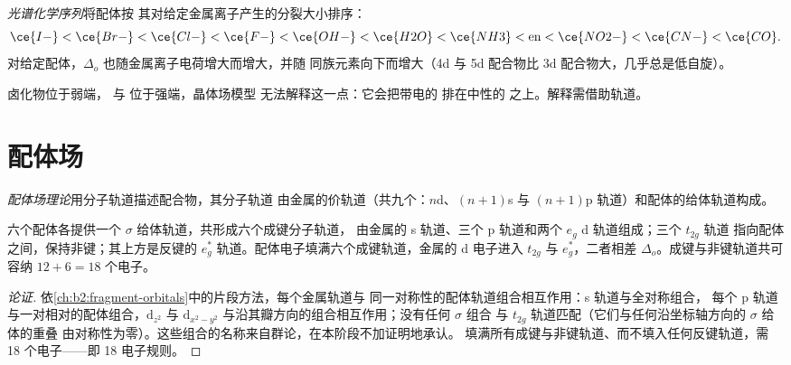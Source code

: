 \begin{definition}[光谱化学序列]\label{def:b2:ligand-field:spectrochemical}
\emph{光谱化学序列}将配体按
其对给定金属离子产生的分裂大小排序：
\[
  \ce{I-} < \ce{Br-} < \ce{Cl-} < \ce{F-} < \ce{OH-} < \ce{H2O} < \ce{NH3} < \text{en} <
  \ce{NO2-} < \ce{CN-} < \ce{CO} .
\]
对给定配体，$\Delta_o$ 也随金属离子电荷增大而增大，并随
同族元素向下而增大（4d 与 5d 配合物比 3d 配合物大，几乎总是低自旋）。
\end{definition}

卤化物位于弱端， 与  位于强端，晶体场模型
无法解释这一点：它会把带电的  排在中性的
 之上。解释需借助轨道。

\section{配体场}

\begin{definition}[配体场理论]\label{def:b2:ligand-field:ligand-field}
\emph{配体场理论}用分子轨道描述配合物，其分子轨道
由金属的价轨道（共九个：$n$d、$(n+1)$s 与 $(n+1)$p
轨道）和配体的给体轨道构成。
\end{definition}

\begin{proposition}\label{prop:b2:ligand-field:mo-octahedral}
六个配体各提供一个 $\sigma$ 给体轨道，共形成六个成键分子轨道，
由金属的 s 轨道、三个 p 轨道和两个 $e_g$ d 轨道组成；三个 $t_{2g}$ 轨道
指向配体之间，保持非键；其上方是反键的 $e_g^*$
轨道。配体电子填满六个成键轨道，金属的 d 电子进入
$t_{2g}$ 与 $e_g^*$，二者相差 $\Delta_o$。成键与非键轨道共可容纳
$12 + 6 = 18$ 个电子。
\end{proposition}

\begin{proof}[论证]
依\cref{ch:b2:fragment-orbitals}中的片段方法，每个金属轨道与
同一对称性的配体轨道组合相互作用：s 轨道与全对称组合，
每个 p 轨道与一对相对的配体组合，$\mathrm d_{z^2}$ 与 $\mathrm
d_{x^2-y^2}$ 与沿其瓣方向的组合相互作用；没有任何 $\sigma$ 组合
与 $t_{2g}$ 轨道匹配（它们与任何沿坐标轴方向的 $\sigma$ 给体的重叠
由对称性为零）。这些组合的名称来自群论，在本阶段不加证明地承认。
填满所有成键与非键轨道、而不填入任何反键轨道，需
18 个电子——即 18 电子规则。
\end{proof}


